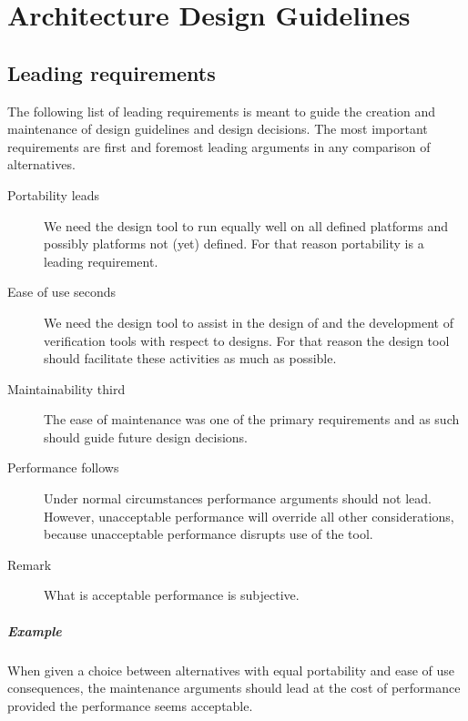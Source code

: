 \chapter{Architecture Design Guidelines}

\section{Leading requirements}

The following list of leading requirements is meant to guide the creation and maintenance
of design guidelines and design decisions. The most important requirements are first
and foremost leading arguments in any comparison of alternatives. 

\begin{description}

	\item[Portability leads] We need the design tool to run equally well on all defined platforms
	and possibly platforms not (yet) defined. For that reason portability is a leading requirement.
	
	\item[Ease of use seconds] We need the design tool to assist in the design of \Noc and
	the development of verification tools with respect to \Noc designs. For that reason the design
	tool should facilitate these activities as much as possible. 
	
	\item[Maintainability third] The ease of maintenance was one of the primary requirements and
	as such should guide future design decisions. 
	
	\item[Performance follows] Under normal circumstances performance arguments should not lead.
	However, unacceptable performance will override all other considerations, because
	unacceptable performance disrupts use of the tool. 
	
	\item[Remark] What is acceptable performance is subjective. 
	
\end{description}

\paragraph{Example} When given a choice between alternatives with equal portability and 
ease of use consequences, the maintenance arguments should lead at the cost of performance 
provided the performance seems acceptable.

